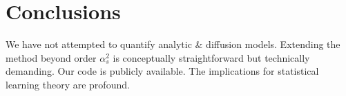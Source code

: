 \section{Conclusions}\label{sec:conclusions}

We have not attempted to quantify analytic & diffusion models. Extending
the method beyond order $\alpha_s^2$ is conceptually straightforward but
technically demanding. Our code is publicly available. The implications
for statistical learning theory are profound.

